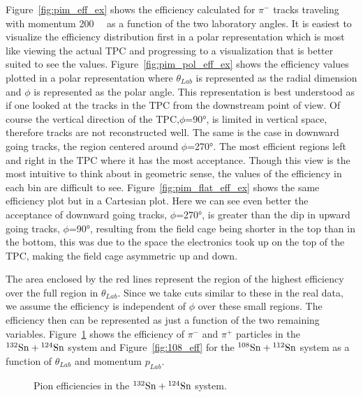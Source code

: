  
Figure~\ref{fig:pim_eff_ex} shows the efficiency calculated for $\pi^-$ tracks traveling with momentum \SI{200}{\mega\eVperc} as a function of the two laboratory angles. It is easiest to visualize the efficiency distribution first in a polar representation which is most like viewing the actual TPC and progressing to a visualization that is better suited to see the values. Figure~\ref{fig:pim_pol_eff_ex} shows the efficiency values plotted in a polar representation where $\theta_{Lab}$ is represented as the radial dimension and $\phi$ is represented as the polar angle. This representation is best understood as if one looked at the tracks in the TPC from the downstream point of view. Of course the vertical direction of the TPC,$\phi$=\ang{90}, is limited in vertical space, therefore tracks are not reconstructed well. The same is the case in downward going tracks, the region centered around $\phi$=\ang{270}. The most efficient regions left and right in the TPC where it has the most acceptance. Though this view is the most intuitive to think about in geometric sense, the values of the efficiency in each bin are difficult to see. Figure~\ref{fig:pim_flat_eff_ex} shows the same efficiency plot but in a Cartesian plot. Here we can see even better the acceptance of downward going tracks, $\phi$=\ang{270}, is greater than the dip in upward going tracks, $\phi$=\ang{90}, resulting from the field cage being shorter in the top than in the bottom, this was due to the space the electronics took up on the top of the TPC, making the field cage asymmetric up and down. 

The area enclosed by the red lines represent the region of the highest efficiency over the full region in $\theta_{Lab}$.  Since we take cuts similar to these in the real data, we assume the efficiency is independent of $\phi$ over these small regions. The efficiency then can be represented as just a function of the two remaining variables. Figure~\ref{fig:132_eff} shows the efficiency of $\pi^-$ and $\pi^+$ particles in the ${}^{132}\mathrm{Sn} + {}^{124}\mathrm{Sn}$ system and Figure~\ref{fig:108_eff} for the ${}^{108}\mathrm{Sn} + {}^{112}\mathrm{Sn}$ system as a function of $\theta_{Lab}$ and momentum $p_{Lab}$. 



\begin{figure}[!htb]%
    \centering
    \qquad
    \caption{Pion efficiencies in the ${}^{132}\mathrm{Sn} + {}^{124}\mathrm{Sn}$ system. }
	\label{fig:132_eff}
\end{figure}



